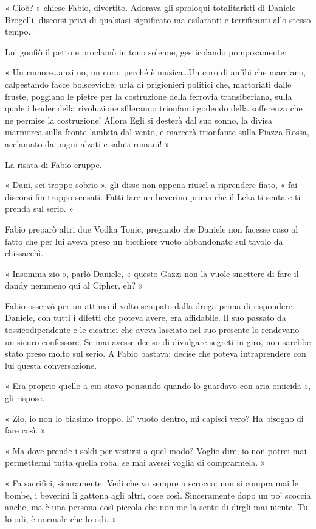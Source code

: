 « Cioè? » chiese Fabio, divertito. Adorava gli sproloqui totalitaristi di Daniele Brogelli, discorsi privi di qualsiasi significato ma esilaranti e terrificanti allo stesso tempo.

Lui gonfiò il petto e proclamò in tono solenne, gesticolando pomposamente:

« Un rumore\ldots anzi no, un coro, perché è musica\ldots Un coro di anfibi che marciano, calpestando facce bolsceviche; urla di prigionieri politici che, martoriati dalle fruste, poggiano le pietre per la costruzione della ferrovia transiberiana, sulla quale i leader della rivoluzione sfileranno trionfanti godendo della sofferenza che ne permise la costruzione! Allora Egli si desterà dal suo sonno, la divisa marmorea sulla fronte lambita dal vento, e marcerà trionfante sulla Piazza Rossa, acclamato da pugni alzati e saluti romani! »

La risata di Fabio eruppe.

« Dani, sei troppo sobrio », gli disse non appena riuscì a riprendere fiato, « fai discorsi fin troppo sensati. Fatti fare un beverino prima che il Leka ti senta e ti prenda sul serio. »

Fabio preparò altri due Vodka Tonic, pregando che Daniele non facesse caso al fatto che per lui aveva preso un bicchiere vuoto abbandonato sul tavolo da chissacchì.

« Insomma zio », parlò Daniele, « questo Gazzi non la vuole smettere di fare il dandy nemmeno qui al Cipher, eh? »

Fabio osservò per un attimo il volto sciupato dalla droga prima di rispondere. Daniele, con tutti i difetti che poteva avere, era affidabile. Il suo passato da tossicodipendente e le cicatrici che aveva lasciato nel suo presente lo rendevano un sicuro confessore. Se mai avesse deciso di divulgare segreti in giro, non sarebbe stato preso molto sul serio. A Fabio bastava: decise che poteva intraprendere con lui questa conversazione.

« Era proprio quello a cui stavo pensando quando lo guardavo con aria omicida », gli rispose.

« Zio, io non lo biasimo troppo. E' vuoto dentro, mi capisci vero? Ha bisogno di fare così. »

« Ma dove prende i soldi per vestirsi a quel modo? Voglio dire, io non potrei mai permettermi tutta quella roba, se mai avessi voglia di comprarmela. »

« Fa sacrifici, sicuramente. Vedi che va sempre a scrocco: non si compra mai le bombe, i beverini li gattona agli altri, cose così. Sinceramente dopo un po' scoccia anche, ma è una persona così piccola che non me la sento di dirgli mai niente. Tu lo odi, è normale che lo odi\ldots »


